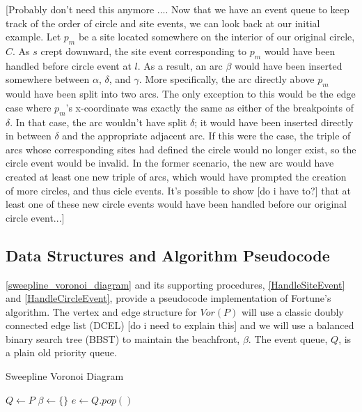 \documentclass[12pt,twoside]{reedthesis}
\begin{document}
 [Probably don't need this anymore .... Now that we have an event queue to keep track of the order of circle and site events, we can look back at our initial example. Let $p_{m}$ be a site located somewhere on the interior of our original circle, $C$. As $s$ crept downward, the site event corresponding to $p_{m}$ would have been handled before circle event at $l$. As a result, an arc $\beta$ would have been inserted somewhere between $\alpha$, $\delta$, and $\gamma$. More specifically, the arc directly above $p_{m}$ would have been split into two arcs. The only exception to this would be the edge case where $p_{m}$'s x-coordinate was exactly the same as either of the breakpoints of $\delta$. In that case, the arc wouldn't have split $\delta$; it would have been inserted directly in between $\delta$ and the appropriate adjacent arc. If this were the case, the triple of arcs whose corresponding sites had defined the circle would no longer exist, so the circle event would be invalid. In the former scenario, the new arc would have created at least one new triple of arcs, which would have prompted the creation of more circles, and thus cicle events. It's possible to show [do i have to?] that at least one of these new circle events would have been handled before our original circle event...]

  \subsection{Data Structures and Algorithm Pseudocode} %
  \label{sub:sweep_algorithm_pseudocode}
  \cref{sweepline_voronoi_diagram} and its supporting procedures, \cref{HandleSiteEvent} and \cref{HandleCircleEvent}, provide a pseudocode implementation of Fortune's algorithm. The vertex and edge structure for $Vor(P)$ will use a classic doubly connected edge list (DCEL) [do i need to explain this] and we will use a balanced binary search tree (BBST) to maintain the beachfront, $\beta$. The event queue, $Q$, is a plain old priority queue.  
  
  \begin{algorithm}[H]
  \begin{algorithmic}[1]
  \caption{Sweepline Voronoi Diagram}\label{sweepline_voronoi_diagram}
  \State $Q\gets P$
  \State $\beta\gets \{\}$
    \State $e\gets Q.pop()$
    \State{}
    \Else
    \State{}
    \EndIf
  \EndWhile
  \EndProcedure
  \end{algorithmic} 
  \end{algorithm}
\end{document}
